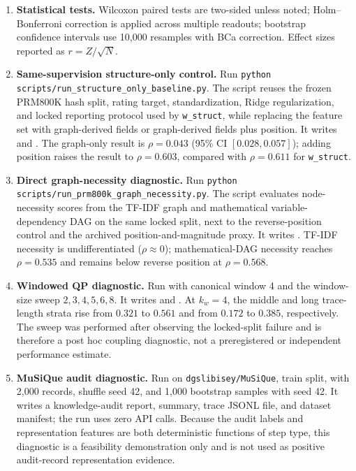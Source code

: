 \documentclass[pdflatex,sn-mathphys-num]{sn-jnl}
\begin{document}
\begin{enumerate}
\item \textbf{Statistical tests.} Wilcoxon paired tests are two-sided unless noted; Holm--Bonferroni correction is applied across multiple readouts; bootstrap confidence intervals use 10{,}000 resamples with BCa correction. Effect sizes reported as $r = Z/\sqrt{N}$.
\item \textbf{Same-supervision structure-only control.} Run \texttt{python scripts/run\_structure\_only\_baseline.py}. The script reuses the frozen PRM800K hash split, rating target, standardization, Ridge regularization, and locked reporting protocol used by \texttt{w\_struct}, while replacing the feature set with graph-derived fields or graph-derived fields plus position. It writes  and . The graph-only result is $\rho=0.043$ (95\% CI $[0.028,0.057]$); adding position raises the result to $\rho=0.603$, compared with $\rho=0.611$ for \texttt{w\_struct}.
\item \textbf{Direct graph-necessity diagnostic.} Run \texttt{python scripts/run\_prm800k\_graph\_necessity.py}. The script evaluates node-necessity scores from the TF-IDF graph and mathematical variable-dependency DAG on the same locked split, next to the reverse-position control and the archived position-and-magnitude proxy. It writes . TF-IDF necessity is undifferentiated ($\rho\approx0$); mathematical-DAG necessity reaches $\rho=0.535$ and remains below reverse position at $\rho=0.568$.
\item \textbf{Windowed QP diagnostic.} Run  with canonical window 4 and the window-size sweep $2,3,4,5,6,8$. It writes  and . At $k_w=4$, the middle and long trace-length strata rise from $0.321$ to $0.561$ and from $0.172$ to $0.385$, respectively. The sweep was performed after observing the locked-split failure and is therefore a post hoc coupling diagnostic, not a preregistered or independent performance estimate.
\item \textbf{MuSiQue audit diagnostic.} Run  on \texttt{dgslibisey/MuSiQue}, train split, with 2,000 records, shuffle seed 42, and 1,000 bootstrap samples with seed 42. It writes a knowledge-audit report, summary, trace JSONL file, and dataset manifest; the run uses zero API calls. Because the audit labels and representation features are both deterministic functions of step type, this diagnostic is a feasibility demonstration only and is not used as positive audit-record representation evidence.

\end{enumerate}
\end{document}
